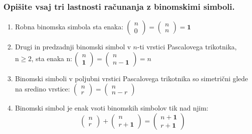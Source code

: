 \documentclass{article}
\begin{document}
\subsubsection*{Opišite vsaj tri lastnosti računanja z binomskimi simboli.}

\begin{enumerate}
  \item Robna binomska simbola sta enaka: $\left(\begin{array}{l}n \\ 0\end{array}\right)=\left(\begin{array}{l}n \\ n\end{array}\right)=\mathbf{1}$

  \item Drugi in predzadnji binomski simbol v $n$-ti vrstici Pascalovega trikotnika, $\mathrm{n} \geq 2$, sta enaka $\mathrm{n}:\left(\begin{array}{l}n \\ \mathbf{1}\end{array}\right)=\left(\begin{array}{c}n \\ n-\mathbf{1}\end{array}\right)=n$

  \item Binomski simboli v poljubni vrstici Pascalovega trikotnika so simetrični glede na sredino vrstice: $\left(\begin{array}{l}n \\ r\end{array}\right)=\left(\begin{array}{c}n \\ n-r\end{array}\right)$

  \item Binomski simbol je enak vsoti binomskih simbolov tik nad njim:
    $$
    \left(\begin{array}{l}
    n \\
    r
    \end{array}\right)+\left(\begin{array}{c}
    n \\
    r+\mathbf{1}
    \end{array}\right)=\left(\begin{array}{l}
    n+\mathbf{1} \\
    r+\mathbf{1}
    \end{array}\right)
    $$
\end{enumerate}
\end{document}

